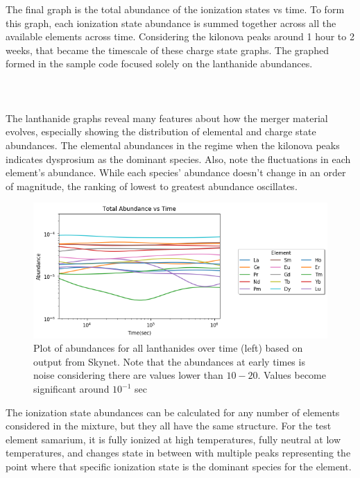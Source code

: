 \documentclass[11pt,a4paper]{article}
\begin{document}
The final graph is the total abundance of the ionization states vs time. To form this graph, each ionization state abundance is summed together across all the available elements across time. Considering the kilonova peaks around 1 hour to 2 weeks, that became the timescale of these charge state graphs. The graphed formed in the sample code focused solely on the lanthanide abundances.      		
\\\\
\\\\
The lanthanide graphs reveal many features about how the merger material evolves, especially showing the distribution of elemental and charge state abundances. The elemental abundances in the regime when the kilonova peaks indicates dysprosium as the dominant species. Also, note the fluctuations in each element's abundance. While each species' abundance doesn't change in an order of magnitude, the ranking of lowest to greatest abundance oscillates.

\begin{figure}[h!]
  \includegraphics[width=1\textwidth]{elemental.png}
  \caption{Plot of abundances for all lanthanides over time (left) based on output from Skynet. Note that the abundances at early times is noise considering there are values lower than $10-20$. Values become significant around $10^{-1}$ sec}
\end{figure} 

The ionization state abundances can be calculated for any number of elements considered in the mixture, but they all have the same structure. For the test element samarium, it is fully ionized at high temperatures, fully neutral at low temperatures, and changes state in between with multiple peaks representing the point where that specific ionization state is the dominant species for the element.  
\end{document}
